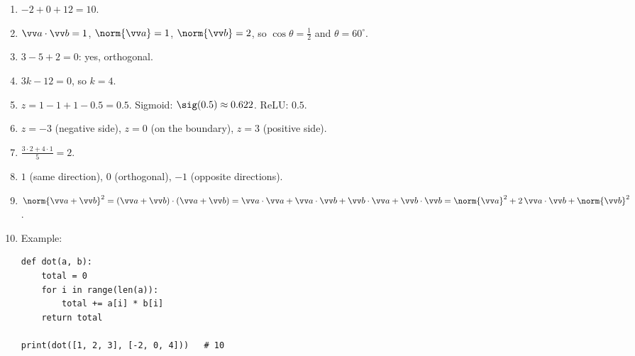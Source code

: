 \begin{enumerate}[label=\textbf{\ansnum.\arabic*}]
  \item $-2+0+12=10$.
  \item $\vv a\cdot\vv b=1$, $\norm{\vv a}=1$, $\norm{\vv b}=2$, so $\cos\theta=\frac12$ and $\theta=60^\circ$.
  \item $3-5+2=0$: yes, orthogonal.
  \item $3k-12=0$, so $k=4$.
  \item $z=1-1+1-0.5=0.5$. Sigmoid: $\sig(0.5)\approx0.622$. ReLU: $0.5$.
  \item $z=-3$ (negative side), $z=0$ (on the boundary), $z=3$ (positive side).
  \item $\frac{3\cdot2+4\cdot1}{5}=2$.
  \item $1$ (same direction), $0$ (orthogonal), $-1$ (opposite directions).
  \item $\norm{\vv a+\vv b}^2=(\vv a+\vv b)\cdot(\vv a+\vv b)=\vv a\cdot\vv a+\vv a\cdot\vv b+\vv b\cdot\vv a+\vv b\cdot\vv b=\norm{\vv a}^2+2\,\vv a\cdot\vv b+\norm{\vv b}^2$.
  \item Example:
\begin{verbatim}
def dot(a, b):
    total = 0
    for i in range(len(a)):
        total += a[i] * b[i]
    return total

print(dot([1, 2, 3], [-2, 0, 4]))   # 10
\end{verbatim}
\end{enumerate}
